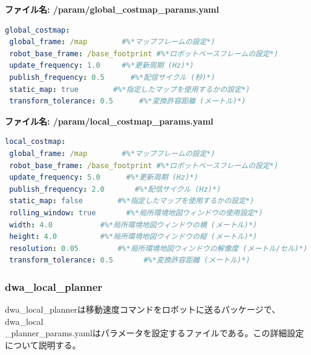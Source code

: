 \textbf{ファイル名: /param/global\_costmap\_params.yaml}
\begin{lstlisting}[language=YAML]
global_costmap:
 global_frame: /map        #%*マップフレームの設定*)
 robot_base_frame: /base_footprint #%*ロボットベースフレームの設定*)
 update_frequency: 1.0     #%*更新周期 (Hz)*)
 publish_frequency: 0.5      #%*配信サイクル (秒)*)
 static_map: true        #%*指定したマップを使用するかの設定*)
 transform_tolerance: 0.5      #%*変換許容距離 (メートル)*)
\end{lstlisting}

\textbf{ファイル名: /param/local\_costmap\_params.yaml}
\begin{lstlisting}[language=YAML]
local_costmap:
 global_frame: /map        #%*マップフレームの設定*)
 robot_base_frame: /base_footprint #%*ロボットベースフレームの設定*)
 update_frequency: 5.0      #%*更新周期 (Hz)*)
 publish_frequency: 2.0       #%*配信サイクル (Hz)*)
 static_map: false        #%*指定したマップを使用するかの設定*)
 rolling_window: true       #%*局所環境地図ウィンドウの使用設定*)
 width: 4.0           #%*局所環境地図ウィンドウの横 (メートル)*)
 height: 4.0          #%*局所環境地図ウィンドウの縦 (メートル)*)
 resolution: 0.05         #%*局所環境地図ウィンドウの解像度 (メートル/セル)*)
 transform_tolerance: 0.5       #%*変換許容距離 (メートル)*)
\end{lstlisting}

\subsubsection{dwa\_local\_planner}
dwa\_local\_plannerは移動速度コマンドをロボットに送るパッケージで、dwa\_local\\\_planner\_params.yamlはパラメータを設定するファイルである。この詳細設定について説明する。

